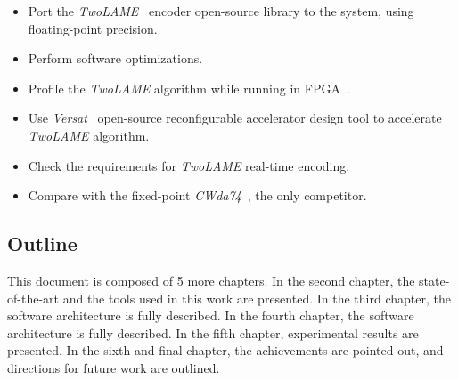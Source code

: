 \begin{itemize}
    \item Port the \textit{TwoLAME}~\cite{bib:twolame} encoder open-source library to the system, using floating-point precision.
    \item Perform software optimizations.
    \item Profile the \textit{TwoLAME} algorithm while running in FPGA~\cite{fpga}.
    \item Use \textit{Versat}~\cite{bib:iobversat} open-source reconfigurable accelerator design tool to accelerate \textit{TwoLAME} algorithm.
    \item Check the requirements for \textit{TwoLAME} real-time encoding.
    \item Compare with the fixed-point \textit{CWda74}~\cite{CWda74}, the only competitor.
\end{itemize}

\subsection{Outline}

This document is composed of 5 more chapters. In the second chapter, the state-of-the-art and the tools used in this work are presented. In the third chapter, the software architecture is fully described. In the fourth chapter, the software architecture is fully described. In the fifth chapter, experimental results are presented. In the sixth and final chapter, the achievements are pointed out, and directions for future work are outlined.





